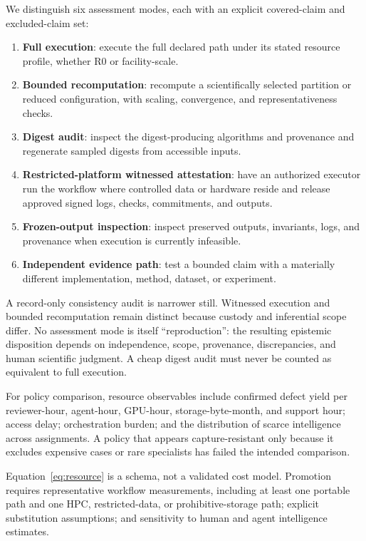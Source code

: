 \documentclass[11pt]{article}
\begin{document}
We distinguish six assessment modes, each with an explicit covered-claim and excluded-claim set:
\begin{enumerate}
 \item \textbf{Full execution}: execute the full declared path under its stated resource profile, whether R0 or facility-scale.
 \item \textbf{Bounded recomputation}: recompute a scientifically selected partition or reduced configuration, with scaling, convergence, and representativeness checks.
 \item \textbf{Digest audit}: inspect the digest-producing algorithms and provenance and regenerate sampled digests from accessible inputs.
 \item \textbf{Restricted-platform witnessed attestation}: have an authorized executor run the workflow where controlled data or hardware reside and release approved signed logs, checks, commitments, and outputs.
 \item \textbf{Frozen-output inspection}: inspect preserved outputs, invariants, logs, and provenance when execution is currently infeasible.
 \item \textbf{Independent evidence path}: test a bounded claim with a materially different implementation, method, dataset, or experiment.
\end{enumerate}
A record-only consistency audit is narrower still. Witnessed execution and bounded recomputation remain distinct because custody and inferential scope differ. No assessment mode is itself ``reproduction'': the resulting epistemic disposition depends on independence, scope, provenance, discrepancies, and human scientific judgment. A cheap digest audit must never be counted as equivalent to full execution.

For policy comparison, resource observables include confirmed defect yield per reviewer-hour, agent-hour, GPU-hour, storage-byte-month, and support hour; access delay; orchestration burden; and the distribution of scarce intelligence across assignments.  A policy that appears capture-resistant only because it excludes expensive cases or rare specialists has failed the intended comparison.

\begin{evidencegate}
Equation~\eqref{eq:resource} is a schema, not a validated cost model.  Promotion requires representative workflow measurements, including at least one portable path and one HPC, restricted-data, or prohibitive-storage path; explicit substitution assumptions; and sensitivity to human and agent intelligence estimates.
\end{evidencegate}
\end{document}
